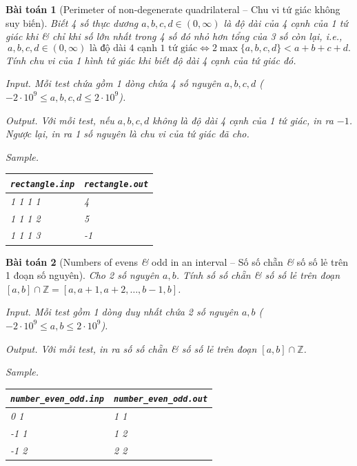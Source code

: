 \documentclass{article}
\newtheorem{baitoan}{Bài toán}
\begin{document}
\begin{baitoan}[Perimeter of non-degenerate quadrilateral -- Chu vi tứ giác không suy biến]
	Biết 4 số thực dương $a,b,c,d\in(0,\infty)$ là độ dài của 4 cạnh của 1 tứ giác khi {\it\&} chỉ khi số lớn nhất trong 4 số đó nhỏ hơn tổng của 3 số còn lại, i.e.,
	\begin{equation*}
		a,b,c,d\in(0,\infty)\mbox{ là độ dài 4 cạnh 1 tứ giác}\Leftrightarrow2\max\{a,b,c,d\} < a + b + c + d.
	\end{equation*}
	Tính chu vi của 1 hình tứ giác khi biết độ dài 4 cạnh của tứ giác đó.
    \item {\sf Input.} Mỗi test chứa gồm 1 dòng chứa 4 số nguyên $a,b,c,d$ ($-2\cdot10^9\le a,b,c,d\le2\cdot10^9$).
    \item {\sf Output.} Với mỗi test, nếu $a,b,c,d$ không là độ dài 4 cạnh của 1 tứ giác, in ra $-1$. Ngược lại, in ra 1 số nguyên là chu vi của tứ giác đã cho.
    \item {\sf Sample.}
    \begin{table}[H]
        \centering
        \begin{tabular}{|l|l|}
            \hline
            \verb|rectangle.inp| & \verb|rectangle.out| \\
            \hline
            1 1 1 1 & 4 \\
            \hline
            1 1 1 2 & 5\\
            \hline
            1 1 1 3 & -1\\
            \hline
        \end{tabular}
    \end{table}
\end{baitoan}

\begin{baitoan}[Numbers of evens {\it\&} odd in an interval -- Số số chẵn {\it\&} số số lẻ trên 1 đoạn số nguyên]
	Cho 2 số nguyên $a,b$. Tính số số chẵn {\it\&} số số lẻ trên đoạn $[a,b]\cap\mathbb{Z} = [a,a + 1,a + 2,\ldots,b - 1, b]$.
	\item {\sf Input.} Mỗi test gồm 1 dòng duy nhất chứa 2 số nguyên $a,b$ ($-2\cdot10^9\le a,b\le2\cdot10^9$).
	\item {\sf Output.} Với mỗi test, in ra số số chẵn {\it\&} số số lẻ trên đoạn $[a,b]\cap\mathbb{Z}$.
	\item {\sf Sample.}
	\begin{table}[H]
		\centering
		\begin{tabular}{|l|l|}
			\hline
			\verb|number_even_odd.inp| & \verb|number_even_odd.out| \\
			\hline
			0 1 & 1 1 \\
			\hline
			-1 1 & 1 2\\
			\hline
			-1 2 & 2 2\\
			\hline
		\end{tabular}
	\end{table}
\end{baitoan}
\end{document}
